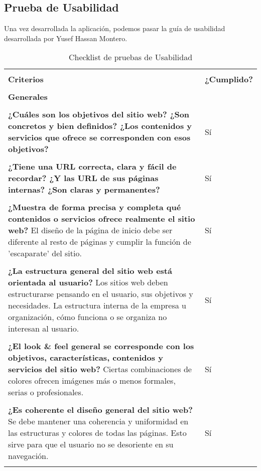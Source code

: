 \subsection{Prueba de Usabilidad}
Una vez desarrollada la aplicación, podemos pasar la guía de usabilidad desarrollada por Yusef Hassan Montero\cite{Usabilidad}.
\begin{longtable}[H]{p{31em}|p{5em}}
\caption{Checklist de pruebas de Usabilidad}
\\ \hline  \\[-1em]
\cellcolor[rgb]{.949,  .949,  .949} \textbf{Criterios} & \cellcolor[rgb]{.949,  .949,  .949}\textbf{¿Cumplido?} \\ \hline  \\[-1em]
\multicolumn{2}{p{36em}}{\cellcolor[rgb]{ .851,  .886,  .953} \textbf{Generales}} \\ \hline \\[-1em]
\textbf{¿Cuáles son los objetivos del sitio web? ¿Son concretos y bien definidos? ¿Los contenidos y servicios que ofrece se corresponden con esos objetivos?} & Sí \\ \hline \\[-1em]
\textbf{¿Tiene una URL correcta, clara y fácil de recordar? ¿Y las URL de sus páginas internas? ¿Son claras y permanentes?} & Sí \\ \hline \\[-1em]
\textbf{¿Muestra de forma precisa y completa qué contenidos o servicios ofrece realmente el sitio web?} El diseño de la página de inicio debe ser diferente al resto de páginas y cumplir la función de 'escaparate' del sitio. & Sí \\ \hline \\[-1em]
\textbf{¿La estructura general del sitio web está orientada al usuario?} Los sitios web deben estructurarse pensando en el usuario, sus objetivos y necesidades. La estructura interna de la empresa u organización, cómo funciona o se organiza no interesan al usuario. & Sí \\ \hline \\[-1em]
\textbf{¿El look \& feel general se corresponde con los objetivos, características, contenidos y servicios del sitio web?} Ciertas combinaciones de colores ofrecen imágenes más o menos formales, serias o profesionales. & Sí \\ \hline \\[-1em]
\textbf{¿Es coherente el diseño general del sitio web?} Se debe mantener una coherencia y uniformidad en las estructuras y colores de todas las páginas. Esto sirve para que el usuario no se desoriente en su navegación. & Sí \\ \hline \\[-1em]

\end{longtable}
